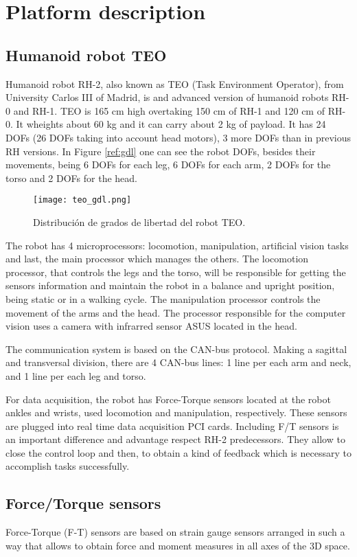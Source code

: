 
\chapter{Platform description}
\section{Humanoid robot TEO}
Humanoid robot RH-2, also known as TEO (Task Environment Operator), from University Carlos III of Madrid, is and advanced version of humanoid robots RH-0 and RH-1. TEO is 165 cm high overtaking 150 cm of RH-1 and 120 cm of RH-0. It wheights about 60 kg and it can carry about 2 kg of payload. It has 24 DOFs (26 DOFs taking into account head motors), 3 more DOFs than in previous RH versions. In Figure \ref{ref:gdl} one can see the robot DOFs, besides their movements, being 6 DOFs for each leg, 6 DOFs for each arm, 2 DOFs for the torso and 2 DOFs for the head.

\begin{figure}[!hbt]
\centering
\texttt{[image: teo\_gdl.png]}
\caption{Distribución de grados de libertad del robot TEO.}
\label{fig:gdl}
\end{figure}

The robot has 4 microprocessors: locomotion, manipulation, artificial vision tasks and last, the main processor which manages the others. The locomotion processor, that controls the legs and the torso, will be responsible for getting the sensors information and maintain the robot in a balance and upright position, being static or in a walking cycle. The manipulation processor controls the movement of the arms and the head. The processor responsible for the computer vision uses a camera with infrarred sensor ASUS located in the head.

The communication system is based on the CAN-bus protocol. Making a sagittal and transversal division, there are 4 CAN-bus lines: 1 line per each arm and neck, and 1 line per each leg and torso.

For data acquisition, the robot has Force-Torque sensors located at the robot ankles and wrists, used locomotion and manipulation, respectively. These sensors are plugged into real time data acquisition PCI cards. Including F/T sensors is an important difference and advantage respect RH-2 predecessors. They allow to close the control loop and then, to obtain a kind of feedback which is necessary to accomplish tasks successfully.


\section{Force/Torque sensors}
Force-Torque (F-T) sensors are based on strain gauge sensors arranged in such a way that allows to obtain force and moment measures in all axes of the 3D space. 

